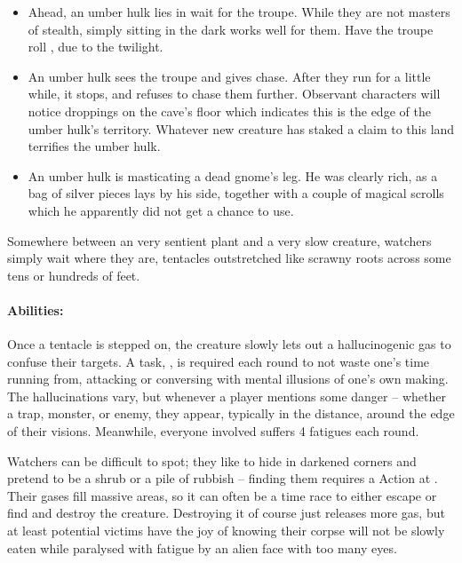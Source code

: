 \begin{multicols}{2}
\begin{itemize}
  \item
  Ahead, an umber hulk lies in wait for the troupe.
  While they are not masters of stealth, simply sitting in the dark works well for them.
  Have the troupe roll , \tn[9] due to the twilight.
  \item
  An umber hulk sees the troupe and gives chase.
  After they run for a little while, it stops, and refuses to chase them further.
  Observant characters will notice droppings on the cave's floor which indicates this is the edge of the umber hulk's territory.
  Whatever new creature has staked a claim to this land terrifies the umber hulk.
  \item
  An umber hulk is masticating a dead gnome's leg.
  He was clearly rich, as a bag of silver pieces lays by his side, together with a couple of magical scrolls which he apparently did not get a chance to use.
\end{itemize}

\umberhulk

\label{watcher}

Somewhere between an very sentient plant and a very slow creature, watchers simply wait where they are, tentacles outstretched like scrawny roots across some tens or hundreds of feet.

\paragraph{Abilities:} Once a tentacle is stepped on, the creature slowly lets out a hallucinogenic gas to confuse their targets.
A  task, \tn[10], is required each round to not waste one's time running from, attacking or conversing with mental illusions of one's own making.
The hallucinations vary, but whenever a player mentions some danger -- whether a trap, monster, or enemy, they appear, typically in the distance, around the edge of their visions.
Meanwhile, everyone involved suffers 4 \glspl{fatigue} each round.

Watchers can be difficult to spot; they like to hide in darkened corners and pretend to be a shrub or a pile of rubbish -- finding them requires a  Action at \tn[10].
Their gases fill massive areas, so it can often be a time race to either escape or find and destroy the creature.
Destroying it of course just releases more gas, but at least potential victims have the joy of knowing their corpse will not be slowly eaten while paralysed with fatigue by an alien face with too many eyes.


\end{multicols}
